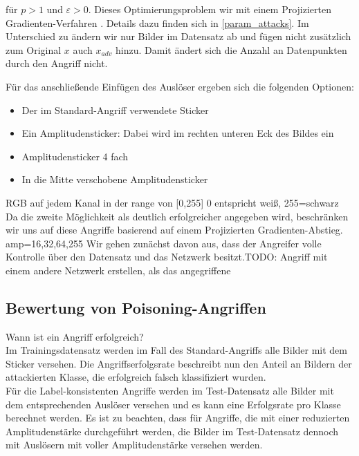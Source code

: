\documentclass[11pt,a4paper]{article}
\numberwithin{equation}{section}
\begin{document}
	für $p >1 $ und $\varepsilon > 0$. Dieses Optimierungsproblem wir mit einem Projizierten Gradienten-Verfahren \cite{madry2017towards}. Details dazu finden sich in \autoref{param_attacks}. Im Unterschied zu \cite{labelconsistent} ändern wir nur Bilder im Datensatz ab und fügen nicht zusätzlich zum Original $x$ auch $x_{adv}$ hinzu. Damit ändert sich die Anzahl an Datenpunkten durch den Angriff nicht.
	
	Für das anschließende Einfügen des Auslöser ergeben sich die folgenden Optionen:
	\begin{itemize}
		\item Der im Standard-Angriff verwendete Sticker
		\item Ein Amplitudensticker: Dabei wird im rechten unteren Eck des Bildes ein 
		\item Amplitudensticker 4 fach
		\item In die Mitte verschobene Amplitudensticker
	\end{itemize}
	RGB auf jedem Kanal in der range von [0,255]
	0 entspricht weiß, 255=schwarz
	Da die zweite Möglichkeit als deutlich erfolgreicher angegeben wird, beschränken wir uns auf diese Angriffe basierend auf einem Projizierten Gradienten-Abstieg.
	amp=16,32,64,255
	Wir gehen zunächst davon aus, dass der Angreifer volle Kontrolle über den Datensatz und das Netzwerk besitzt.TODO: Angriff mit einem andere Netzwerk erstellen, als das angegriffene
	\subsection{Bewertung von Poisoning-Angriffen}
	
	Wann ist ein Angriff erfolgreich?\\
	Im Trainingsdatensatz werden im Fall des Standard-Angriffs alle Bilder mit dem Sticker versehen. Die Angriffserfolgsrate beschreibt nun den Anteil an Bildern der attackierten Klasse, die erfolgreich falsch klassifiziert wurden.\\
	
	Für die Label-konsistenten Angriffe werden im Test-Datensatz alle Bilder mit dem entsprechenden Auslöser versehen und es kann eine Erfolgsrate pro Klasse berechnet werden. Es ist zu beachten, dass für Angriffe, die mit einer reduzierten Amplitudenstärke durchgeführt werden, die Bilder im Test-Datensatz dennoch mit Auslösern mit voller Amplitudenstärke versehen werden. 
	
\end{document}
